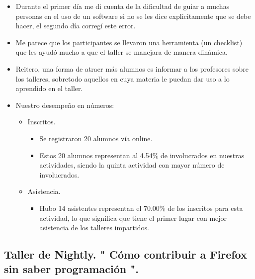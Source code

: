 \documentclass[a4paper,11pt]{article}                 %
\begin{document}
  
    \begin{itemize}
    \item Durante el primer día me di cuenta de la dificultad de guiar a muchas personas en el uso de un software si no se les dice explicitamente que se debe hacer, el segundo día corregí este error.
    \item Me parece que los participantes se llevaron una herramienta (un checklist) que les ayudó mucho a que el taller se manejara de manera dinámica.
    \item Reitero, una forma de atraer más alumnos es informar a los profesores sobre los talleres, sobretodo aquellos en cuya materia le puedan dar uso a lo aprendido en el taller.
    
    \item Nuestro desempeño en números:
    
    \begin{itemize}
 
    
    \item Inscritos.
    \begin{itemize}
      \item Se registraron 20 alumnos vía online.
      \item Estos 20 alumnos representan al 4.54\% de involucrados en nuestras actividades, siendo la quinta actividad con mayor número de involucrados. 
    \end{itemize}
    
    \item Asistencia.
    \begin{itemize}
      \item Hubo 14 asistentes representan el 70.00\% de los inscritos para esta actividad, lo que significa que tiene el primer lugar con mejor asistencia de los talleres impartidos. 
    \end{itemize}
    \end{itemize} 
    
  \end{itemize}     
  \subsection{Taller de Nightly. " {Cómo} contribuir a Firefox sin saber programación ".}  
  
\end{document}
